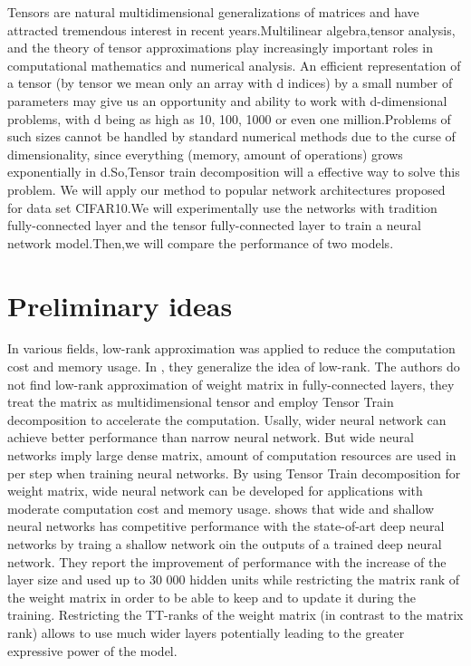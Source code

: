 \documentclass[onecolumn, conference]{IEEEtran}
\begin{document}
Tensors are natural multidimensional generalizations of matrices and have attracted tremendous interest in recent years.Multilinear algebra,tensor analysis, and the theory of tensor approximations play increasingly important roles in computational mathematics and numerical analysis\cite{b7}\cite{b8}\cite{b9}\cite{b10}. An efficient representation of a tensor (by tensor we mean only an array with d indices) by a small number of parameters may give us an opportunity and ability to work with d-dimensional problems, with d being as high as 10, 100, 1000 or even one million.Problems of such sizes cannot be handled by standard numerical methods due to the curse of dimensionality, since everything (memory, amount of operations) grows exponentially in d.So,Tensor train decomposition will a effective way to solve this problem.
We will apply our method to popular network architectures proposed for data set CIFAR10.We will experimentally use the networks with tradition fully-connected layer and the tensor fully-connected layer to train a neural network model.Then,we will compare the performance of two models.

\section{Preliminary ideas}
In various fields, low-rank approximation was applied to reduce the computation cost and memory usage. In \cite{b11}, they generalize the idea of low-rank. The authors do not find low-rank approximation of weight matrix in fully-connected layers, they treat the matrix as multidimensional tensor and employ Tensor Train decomposition \cite{b6} to accelerate the computation.
Usally, wider neural network can achieve better performance than narrow neural network. But wide neural networks imply large dense matrix, amount of computation resources are used in per step when training neural networks. By using Tensor Train decomposition for weight matrix, wide neural network can be developed for applications with moderate computation cost and memory usage. 
\cite{b11} shows that wide and shallow neural networks has competitive performance with the state-of-art deep neural networks by traing a shallow network oin the outputs of a trained deep neural network.
They report the improvement of performance with the increase of the layer size and used up to 30 000 hidden units while restricting the matrix rank of the weight matrix in order to be able to keep and to update it during the training. Restricting the TT-ranks of the weight matrix (in contrast to the matrix rank) allows to use much wider layers potentially leading to the greater expressive power of the model.
\end{document}
